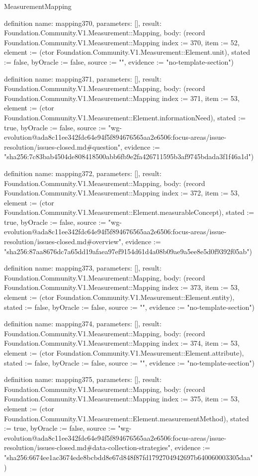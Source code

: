 \begin{lexlean}{MeasurementMapping}
\begin{semanticmodule}
definition{
  name: mapping370,
  parameters: [],
  result: Foundation.Community.V1.Measurement::Mapping,
  body: (record Foundation.Community.V1.Measurement::Mapping {index := 370, item := 52, element := (ctor Foundation.Community.V1.Measurement::Element.unit), stated := false, byOracle := false, source := "", evidence := "no-template-section"})
}

definition{
  name: mapping371,
  parameters: [],
  result: Foundation.Community.V1.Measurement::Mapping,
  body: (record Foundation.Community.V1.Measurement::Mapping {index := 371, item := 53, element := (ctor Foundation.Community.V1.Measurement::Element.informationNeed), stated := true, byOracle := false, source := "wg-evolution@ada8c11ee342fdc64e94f5f894676565aa2e6506:focus-areas/issue-resolution/issues-closed.md#question", evidence := "sha256:7c83bab4504de808418500abb6fb9e2fa426711595b3af9745bdada3f1f46a1d"})
}

definition{
  name: mapping372,
  parameters: [],
  result: Foundation.Community.V1.Measurement::Mapping,
  body: (record Foundation.Community.V1.Measurement::Mapping {index := 372, item := 53, element := (ctor Foundation.Community.V1.Measurement::Element.measurableConcept), stated := true, byOracle := false, source := "wg-evolution@ada8c11ee342fdc64e94f5f894676565aa2e6506:focus-areas/issue-resolution/issues-closed.md#overview", evidence := "sha256:87aa8676dc7a65dd19afaea97ef9154d61d4a08b09ae9a5ee8e5d0f9392f05ab"})
}

definition{
  name: mapping373,
  parameters: [],
  result: Foundation.Community.V1.Measurement::Mapping,
  body: (record Foundation.Community.V1.Measurement::Mapping {index := 373, item := 53, element := (ctor Foundation.Community.V1.Measurement::Element.entity), stated := false, byOracle := false, source := "", evidence := "no-template-section"})
}

definition{
  name: mapping374,
  parameters: [],
  result: Foundation.Community.V1.Measurement::Mapping,
  body: (record Foundation.Community.V1.Measurement::Mapping {index := 374, item := 53, element := (ctor Foundation.Community.V1.Measurement::Element.attribute), stated := false, byOracle := false, source := "", evidence := "no-template-section"})
}

definition{
  name: mapping375,
  parameters: [],
  result: Foundation.Community.V1.Measurement::Mapping,
  body: (record Foundation.Community.V1.Measurement::Mapping {index := 375, item := 53, element := (ctor Foundation.Community.V1.Measurement::Element.measurementMethod), stated := true, byOracle := false, source := "wg-evolution@ada8c11ee342fdc64e94f5f894676565aa2e6506:focus-areas/issue-resolution/issues-closed.md#data-collection-strategies", evidence := "sha256:6674ee1ac3674ede8bcbdd8e67d848f87fd1792704942697b640060003305daa"})
}


\end{semanticmodule}
\end{lexlean}
